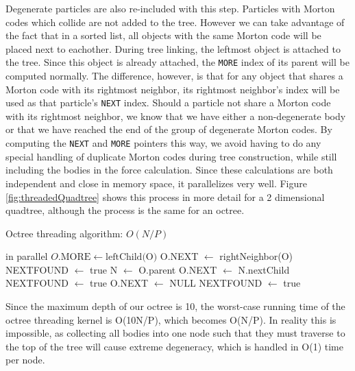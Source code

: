 \documentclass{thesis}
\begin{document}
Degenerate particles are also re-included with this step. Particles with  Morton codes which collide are not added to the tree. However we can take advantage of the fact that in a sorted list, all objects with the same  Morton code will be placed next to eachother. During tree linking, the leftmost object is attached to the tree. Since this object is already attached, the \texttt{MORE} index of its parent will be computed normally. The difference, however, is that for any object that shares a Morton code with its rightmost neighbor, its rightmost neighbor's index will be used as that particle's \texttt{NEXT} index. Should a particle not share a  Morton code with its rightmost neighbor, we know that we have either a non-degenerate body or that we have reached the end of the group of degenerate  Morton codes. By computing the \texttt{NEXT} and \texttt{MORE} pointers this way, we avoid having to do any special handling of duplicate  Morton codes during tree construction, while still including the bodies in the force calculation. Since these calculations are both independent and close in memory space, it parallelizes very well. Figure \ref{fig:threadedQuadtree} shows this process in more detail for a 2 dimensional quadtree, although the process is the same for an octree.

\begin{algorithm}
    \label{alg:OctreeThreading}
    \caption{Octree threading algorithm: $O(N/P)$}
    \begin{algorithmic}
         in parallel
            \State $O.\text{MORE} \gets \text{leftChild(O)}$
                \State O.NEXT $\gets$ rightNeighbor(O)
                \State NEXTFOUND $\gets$ true
            \EndIf
                \State N $\gets$ O.parent
                    \State O.NEXT $\gets$ N.nextChild
                    \State NEXTFOUND $\gets$ true
                    \State O.NEXT $\gets$ NULL
                    \State NEXTFOUND $\gets$ true
                \EndIf
            \EndWhile
        \EndFor
    \end{algorithmic}
\end{algorithm}
Since the maximum depth of our octree is 10, the worst-case running time of the octree threading kernel is O(10N/P), which becomes O(N/P). In reality this is impossible, as collecting all bodies into one node such that they must traverse to the top of the tree will cause extreme degeneracy, which is handled in O(1) time per node.
\end{document}
